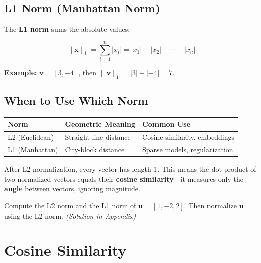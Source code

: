 \documentclass[11pt,a4paper]{article}
\begin{document}
\subsection{L1 Norm (Manhattan Norm)}

The \textbf{L1 norm} sums the absolute values:

\begin{equation}
\boxed{\|\mathbf{x}\|_1 = \sum_{i=1}^{n} |x_i| = |x_1| + |x_2| + \cdots + |x_n|}
\end{equation}

\medskip\noindent\textbf{Example:} $\mathbf{v} = [3, -4]$, then $\|\mathbf{v}\|_1 = |3| + |-4| = 7$.

\subsection{When to Use Which Norm}

\begin{center}
\renewcommand{\arraystretch}{1.3}
\begin{tabular}{@{}lll@{}}
\toprule
\textbf{Norm} & \textbf{Geometric Meaning} & \textbf{Common Use} \\
\midrule
L2 (Euclidean) & Straight-line distance & Cosine similarity, embeddings \\
L1 (Manhattan) & City-block distance & Sparse models, regularization \\
\bottomrule
\end{tabular}
\end{center}

\begin{tcolorbox}[warnbox={Key Point}]
After L2 normalization, every vector has length 1. This means the dot product of two normalized vectors equals their \textbf{cosine similarity}---it measures only the \textbf{angle} between vectors, ignoring magnitude.
\end{tcolorbox}

\begin{tcolorbox}[questionbox={Self-Check Q4}]
Compute the L2 norm and the L1 norm of $\mathbf{u} = [1, -2, 2]$. Then normalize $\mathbf{u}$ using the L2 norm. \textit{(Solution in Appendix)}
\end{tcolorbox}

\section{Cosine Similarity}
\end{document}

